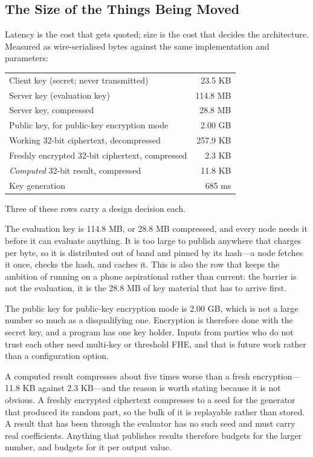 \documentclass[12pt,a4paper]{article}
\begin{document}
\subsection{The Size of the Things Being Moved}

Latency is the cost that gets quoted; size is the cost that decides the architecture.
Measured as wire-serialised bytes against the same implementation and parameters:

\begin{center}
\begin{tabular}{lr}
\hline
Client key (secret; never transmitted) & 23.5 KB \\
Server key (evaluation key) & 114.8 MB \\
Server key, compressed & 28.8 MB \\
Public key, for public-key encryption mode & 2.00 GB \\
Working 32-bit ciphertext, decompressed & 257.9 KB \\
Freshly encrypted 32-bit ciphertext, compressed & 2.3 KB \\
\textit{Computed} 32-bit result, compressed & 11.8 KB \\
Key generation & 685 ms \\
\hline
\end{tabular}
\end{center}

Three of these rows carry a design decision each.

The evaluation key is 114.8 MB, or 28.8 MB compressed, and every node needs it before it can evaluate anything.
It is too large to publish anywhere that charges per byte, so it is distributed out of band and pinned by its hash---a node fetches it once, checks the hash, and caches it.
This is also the row that keeps the ambition of running on a phone aspirational rather than current: the barrier is not the evaluation, it is the 28.8 MB of key material that has to arrive first.

The public key for public-key encryption mode is 2.00 GB, which is not a large number so much as a disqualifying one.
Encryption is therefore done with the secret key, and a program has one key holder.
Inputs from parties who do not trust each other need multi-key or threshold FHE, and that is future work rather than a configuration option.

A computed result compresses about five times worse than a fresh encryption---11.8 KB against 2.3 KB---and the reason is worth stating because it is not obvious.
A freshly encrypted ciphertext compresses to a seed for the generator that produced its random part, so the bulk of it is replayable rather than stored.
A result that has been through the evaluator has no such seed and must carry real coefficients.
Anything that publishes results therefore budgets for the larger number, and budgets for it per output value.
\end{document}
